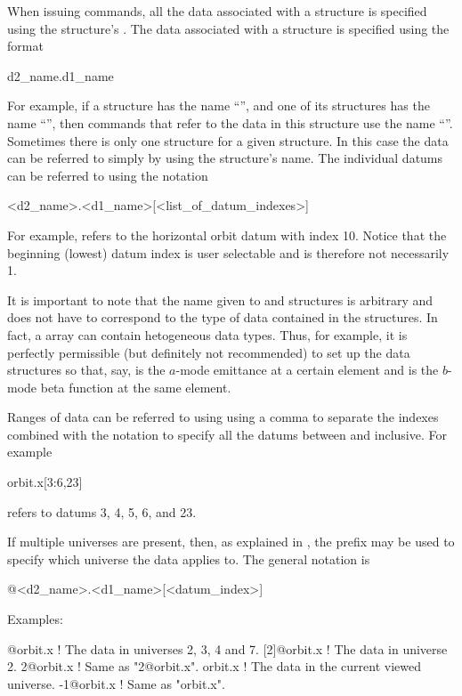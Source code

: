 When issuing \tao commands, all the
data associated with a  structure is specified using the
 structure's .  The data associated with a
 structure is specified using the format
\begin{example}
  d2_name.d1_name
\end{example}
For example, if a  structure has the
name ``'', and one of its  structures has the
name ``'', then \tao commands that refer to the data in this
 structure use the name ``''. Sometimes there
is only one  structure for a given 
structure. In this case the data can be referred to simply by using
the  structure's name. The individual datums can be
referred to using the notation
\begin{example}
  <d2_name>.<d1_name>[<list_of_datum_indexes>]
\end{example}
For example,  refers to the horizontal orbit datum
with index 10. Notice that the beginning (lowest) datum index is user
selectable and is therefore not necessarily 1. 

It is important to note that the name given to  and 
structures is arbitrary and does not have to correspond to the 
type of data contained in the 
structures. In fact, a  array can contain hetogeneous data types.
Thus, for example, it is perfectly permissible (but definitely not recommended) 
to set up the data structures so that, say,  
is the $a$-mode emittance at a certain element and 
is the $b$-mode beta function at the same element.

Ranges of data can be referred to using using a comma \vn{,} to
separate the indexes combined with the notation  to specify
all the datums between  and  inclusive. For example
\begin{example}
  orbit.x[3:6,23]
\end{example}
refers to datums 3, 4, 5, 6, and 23. 

If multiple universes are present, then, as explained in
, the prefix  may be used to specify which
universe the data applies to. The general notation is
\begin{example}
  @<d2_name>.<d1_name>[<datum_index>]
\end{example}
Examples:
\begin{example}
  [2:4,7]@orbit.x ! The  data in universes 2, 3, 4 and 7.
  [2]@orbit.x     ! The  data in universe 2. 
  2@orbit.x       ! Same as "2@orbit.x".
  orbit.x         ! The  data in the current viewed universe.
  -1@orbit.x      ! Same as "orbit.x".
\end{example}

